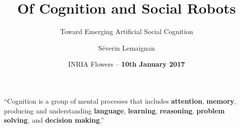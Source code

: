 \documentclass[handout,compress]{beamer}
\title{Of Cognition and Social Robots}
\subtitle{Toward Emerging Artificial Social Cognition}
\date{INRIA Flowers -- {\bf 10th January 2017}}
\author{Séverin Lemaignan}
\institute{Centre for Robotics and Neural Systems\\{\bf
Plymouth University}}
\begin{document}



\maketitle




\begin{frame}[plain]{}

        \LARGE

        ``Cognition is a group of mental processes that includes {\bf
        attention}, {\bf memory}, producing and understanding {\bf
        language}, {\bf learning}, {\bf reasoning}, {\bf problem
        solving}, and {\bf decision making}.''

\end{frame}

\end{document}
